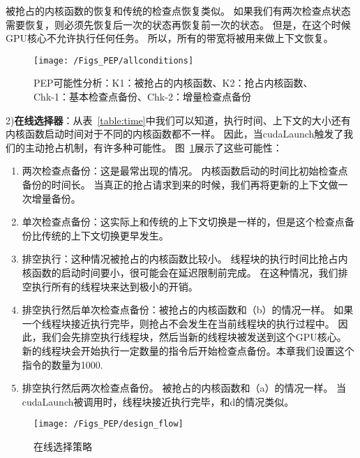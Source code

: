 被抢占的内核函数的恢复和传统的检查点恢复类似。
如果我们有两次检查点状态需要恢复，则必须先恢复后一次的状态再恢复前一次的状态。
但是，在这个时候GPU核心不允许执行任何任务。
所以，所有的带宽将被用来做上下文恢复。

\begin{figure}[htbp] %
  \centering
  \texttt{[image: /Figs\_PEP/allconditions]}
  \caption{PEP可能性分析：K1：被抢占的内核函数、K2：抢占内核函数、Chk-1：基本检查点备份、Chk-2：增量检查点备份}
  \label{fig:allconditions}
\end{figure}


2)\textbf{在线选择器}：从表~\ref{table:time}中我们可以知道，执行时间、上下文的大小还有内核函数启动时间对于不同的内核函数都不一样。
因此，当cudaLaunch触发了我们的主动抢占机制，有许多种可能性。
图~\ref{fig:allconditions}展示了这些可能性：


\renewcommand*\theenumi{(\alph{enumi})}
\begin{enumerate}
\setlength\itemsep{1pt}
\item 两次检查点备份：这是最常出现的情况。
内核函数启动的时间比初始检查点备份的时间长。
当真正的抢占请求到来的时候，我们再将更新的上下文做一次增量备份。

\item 单次检查点备份：这实际上和传统的上下文切换是一样的，但是这个检查点备份比传统的上下文切换更早发生。

\item 排空执行：这种情况被抢占的内核函数比较小。
线程块的执行时间比抢占内核函数的启动时间要小，很可能会在延迟限制前完成。
在这种情况，我们排空执行所有的线程块来达到极小的开销。

\item 排空执行然后单次检查点备份：被抢占的内核函数和（b）的情况一样。
如果一个线程块接近执行完毕，则抢占不会发生在当前线程块的执行过程中。
因此，我们会先排空执行线程块，然后当新的线程块被发送到这个GPU核心。
新的线程块会开始执行一定数量的指令后开始检查点备份。本章我们设置这个指令的数量为1000.

\item 排空执行然后两次检查点备份。
被抢占的内核函数和（a）的情况一样。
当cudaLaunch被调用时，线程块接近执行完毕，和d的情况类似。
\end{enumerate}


\begin{figure}[htbp] %
  \centering
  \texttt{[image: /Figs\_PEP/design\_flow]}
  \caption{在线选择策略}
  \label{fig:design_flow}
\end{figure}

